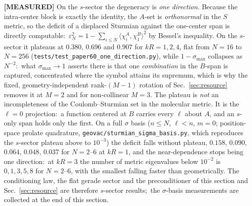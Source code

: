 \documentclass[aps,pra,twocolumn,superscriptaddress,longbibliography]{revtex4-2}
\begin{document}
\textbf{[MEASURED]} On the $s$-sector the degeneracy is \emph{one
direction}.  Because the intra-center block is exactly the identity, the
$A$-set is \emph{orthonormal} in the $S$ metric, so the deficit of a displaced
Sturmian against the one-center span is directly computable:\
$\varepsilon_N^2=1-\sum_{i\le N}\langle\chi^A_i,\chi^B_1\rangle^2$ by Bessel's
inequality.  On the $s$-sector it plateaus at $0.380$, $0.696$ and $0.907$
for $kR=1,2,4$, flat from $N=16$ to $N=256$
(\texttt{tests/test\_paper60\_one\_direction.py}), while $1-\sigma_{\max}$
collapses as $N^{-2}$:\ what $\sigma_{\max}\to1$ asserts there is that one
\emph{combination} in the $B$-span is captured, concentrated where the symbol
attains its supremum, which is why the fixed, geometry-independent
rank-$(M-1)$ rotation of Sec.~\ref{sec:resource} removes it at $M=2$ and for
non-collinear $M=3$.  The plateau is \emph{not} an incompleteness of the
Coulomb--Sturmian set in the molecular metric.  It is the $\ell=0$ projection:\
a function centered at $B$ carries every $\ell$ about $A$, and an $s$-only
span holds only the first.  On a full $\sigma$ basis ($n\le N$, $\ell<n$,
$m=0$; position-space prolate quadrature,
\texttt{geovac/sturmian\_sigma\_basis.py}, which reproduces the $s$-sector
plateau above to $10^{-3}$) the deficit falls without plateau, $0.158$,
$0.090$, $0.064$, $0.048$, $0.037$ for $N=2$--$6$ at $kR=1$, and the
near-dependence stops being one direction:\ at $kR=3$ the number of metric
eigenvalues below $10^{-2}$ is $0,1,3,5,8$ for $N=2$--$6$, with the smallest
falling faster than geometrically.  The conditioning law, the flat gerade sector and the
preconditioner of this section and Sec.~\ref{sec:resource} are therefore
$s$-sector results;\ the $\sigma$-basis measurements are collected at the end of
this section.
\end{document}
